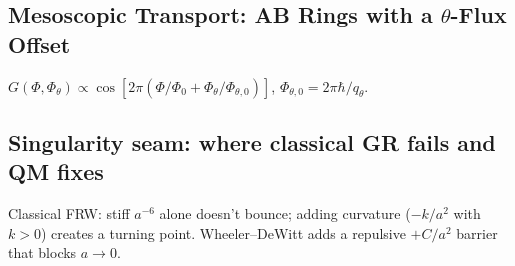 \subsection{Mesoscopic Transport: AB Rings with a \texorpdfstring{$\theta$}{theta}-Flux Offset}\label{sec:mesoscopic}
$G(\Phi,\Phi_\theta)\propto \cos[2\pi(\Phi/\Phi_0+\Phi_\theta/\Phi_{\theta,0})]$, $\Phi_{\theta,0}=2\pi\hbar/q_\theta$.

\subsection{Singularity seam: where classical GR fails and QM fixes}\label{sec:singularity-seam}
Classical FRW: stiff $a^{-6}$ alone doesn’t bounce; adding curvature ($-k/a^2$ with $k>0$) creates a turning point. Wheeler--DeWitt adds a repulsive $+C/a^2$ barrier that blocks $a\to 0$.
